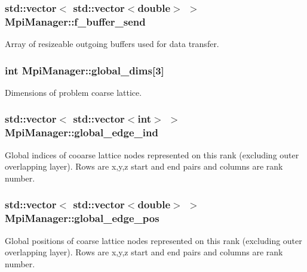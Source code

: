 \subsubsection[{\texorpdfstring{f\+\_\+buffer\+\_\+send}{f_buffer_send}}]{\setlength{\rightskip}{0pt plus 5cm}std\+::vector$<$ std\+::vector$<$double$>$ $>$ Mpi\+Manager\+::f\+\_\+buffer\+\_\+send}\hypertarget{class_mpi_manager_aafbb74832f69a915927b9bf252bd971d}{}\label{class_mpi_manager_aafbb74832f69a915927b9bf252bd971d}


Array of resizeable outgoing buffers used for data transfer. 

\subsubsection[{\texorpdfstring{global\+\_\+dims}{global_dims}}]{\setlength{\rightskip}{0pt plus 5cm}int Mpi\+Manager\+::global\+\_\+dims\mbox{[}3\mbox{]}}\hypertarget{class_mpi_manager_ae41fb382e17680a49821077167bf1905}{}\label{class_mpi_manager_ae41fb382e17680a49821077167bf1905}


Dimensions of problem coarse lattice. 

\subsubsection[{\texorpdfstring{global\+\_\+edge\+\_\+ind}{global_edge_ind}}]{\setlength{\rightskip}{0pt plus 5cm}std\+::vector$<$ std\+::vector$<$int$>$ $>$ Mpi\+Manager\+::global\+\_\+edge\+\_\+ind}\hypertarget{class_mpi_manager_a0f994471f9c2986b2c8606b7b716566a}{}\label{class_mpi_manager_a0f994471f9c2986b2c8606b7b716566a}
Global indices of cooarse lattice nodes represented on this rank (excluding outer overlapping layer). Rows are x,y,z start and end pairs and columns are rank number. 
\subsubsection[{\texorpdfstring{global\+\_\+edge\+\_\+pos}{global_edge_pos}}]{\setlength{\rightskip}{0pt plus 5cm}std\+::vector$<$ std\+::vector$<$double$>$ $>$ Mpi\+Manager\+::global\+\_\+edge\+\_\+pos}\hypertarget{class_mpi_manager_abd8c87e0a21d31b59d7cc1f7f146d5f4}{}\label{class_mpi_manager_abd8c87e0a21d31b59d7cc1f7f146d5f4}
Global positions of coarse lattice nodes represented on this rank (excluding outer overlapping layer). Rows are x,y,z start and end pairs and columns are rank number. 
